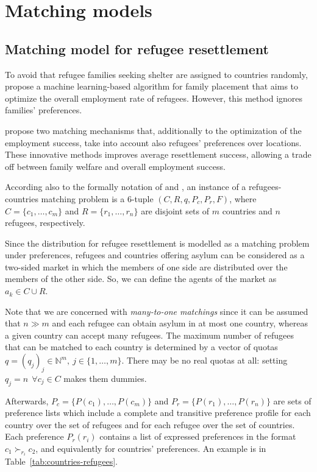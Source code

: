 \section{Matching models}\label{matching-models}%


\subsection{Matching model for refugee resettlement}\label{matching-model-for-refugee-resettlement}%

To avoid that refugee families seeking shelter are assigned to countries randomly, \citet{bansak_2018} propose a machine learning-based algorithm for family placement that aims to optimize the overall employment rate of refugees. However, this method ignores families’ preferences.

\citet{olbergml} propose two matching mechanisms that, additionally to the optimization of the employment success, take into account also refugees’ preferences over locations. These innovative methods improves average resettlement success, allowing a trade off between family welfare and overall employment success.

According also to the formally notation of \citet{salles} and \citet{delacretaz_2020}, an instance of a refugees-countries matching problem is a 6-tuple \((C, R, q, P_c, P_r, F)\), where \(C = \{c_1, \dots, c_m\}\) and \(R = \{r_1, \dots, r_n\}\) are disjoint sets of \(m\) countries and \(n\) refugees, respectively.

Since the distribution for refugee resettlement is modelled as a matching problem under preferences, refugees and countries offering asylum can be considered as a two-sided market in which the members of one side are distributed over the members of the other side. So, we can define the agents of the market as \(a_k \in C \cup R\).

Note that we are concerned with \textit{many-to-one matchings} since it can be assumed that \(n \gg m\) and each refugee can obtain asylum in at most one country, whereas a given country can accept many refugees. The maximum number of refugees that can be matched to each country is determined by a vector of quotas \(q = (q_j)_j \in \mathbb{N}^m,\ j \in \{1, \dots, m\}\). There may be no real quotas at all: setting \(q_j = n\ \ \forall c_j \in C\) makes them dummies.

Afterwards, \(P_c = \{P(c_1), \dots, P(c_m)\}\) and \(P_r =\{P(r_1), \dots, P(r_n)\}\) are sets of preference lists which include a complete and transitive preference profile for each country over the set of refugees and for each refugee over the set of countries. Each preference \(P_r(r_i)\) contains a list of expressed preferences in the format \(c_1 \succ_{r_i} c_2\), and equivalently for countries' preferences. An example is in Table~\ref{tab:countries-refugees}.

